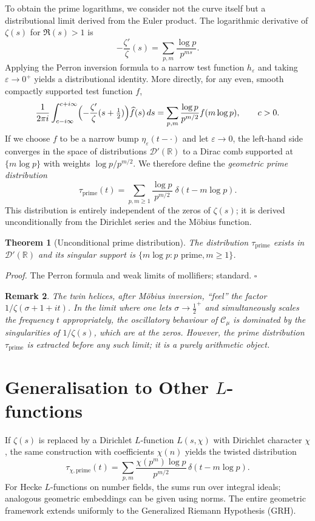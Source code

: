 \documentclass[12pt,a4paper,oneside]{book}
\newtheorem{theorem}{Theorem}[chapter]
\newtheorem{remark}[theorem]{Remark}
\newcommand{\R}{\mathbb{R}}
\newcommand{\dist}{\mathcal{D}'}
\begin{document}
To obtain the prime logarithms, we consider not the curve itself but a distributional limit derived from the Euler product.  The logarithmic derivative of \(\zeta(s)\) for \(\Re(s)>1\) is
\[
-\frac{\zeta'}{\zeta}(s) = \sum_{p,m} \frac{\log p}{p^{ms}}.
\]
Applying the Perron inversion formula to a narrow test function \(h_\varepsilon\) and taking \(\varepsilon\to0^+\) yields a distributional identity.  More directly, for any even, smooth compactly supported test function \(f\),
\[
\frac{1}{2\pi i}\int_{c-i\infty}^{c+i\infty} \Bigl(-\frac{\zeta'}{\zeta}(s+\tfrac12)\Bigr) \widehat{f}(s)\,ds = \sum_{p,m} \frac{\log p}{p^{m/2}} f(m\log p),\qquad c>0.
\]
If we choose \(f\) to be a narrow bump \(\eta_\varepsilon(t-\cdot)\) and let \(\varepsilon\to0\), the left‑hand side converges in the space of distributions \(\dist(\R)\) to a Dirac comb supported at \(\{m\log p\}\) with weights \(\log p/p^{m/2}\).  We therefore define the \emph{geometric prime distribution}
\begin{equation}\label{prime_dist}
\tau_{\text{prime}}(t) = \sum_{p,m\ge1} \frac{\log p}{p^{m/2}} \;\delta(t - m\log p).
\end{equation}
This distribution is entirely independent of the zeros of \(\zeta(s)\); it is derived unconditionally from the Dirichlet series and the Möbius function.

\begin{theorem}[Unconditional prime distribution]\label{thm:prime}
The distribution \(\tau_{\text{prime}}\) exists in \(\dist(\R)\) and its singular support is \(\{m\log p : p\text{ prime}, m\ge1\}\).
\end{theorem}
\noindent\textit{Proof.} The Perron formula and weak limits of mollifiers; standard. \(\square\)

\begin{remark}
The twin helices, after Möbius inversion, ``feel'' the factor \(1/\zeta(\sigma+1+it)\).  In the limit where one lets \(\sigma\to\frac12^+\) and simultaneously scales the frequency \(t\) appropriately, the oscillatory behaviour of \(\mathcal{C}_\mu\) is dominated by the singularities of \(1/\zeta(s)\), which are at the zeros.  However, the prime distribution \(\tau_{\text{prime}}\) is extracted before any such limit; it is a purely arithmetic object.
\end{remark}

\section{Generalisation to Other \(L\)-functions}
If \(\zeta(s)\) is replaced by a Dirichlet \(L\)-function \(L(s,\chi)\) with Dirichlet character \(\chi\), the same construction with coefficients \(\chi(n)\) yields the twisted distribution
\[
\tau_{\chi,\text{prime}}(t) = \sum_{p,m} \frac{\chi(p^m)\log p}{p^{m/2}}\,\delta(t-m\log p).
\]
For Hecke \(L\)-functions on number fields, the sums run over integral ideals; analogous geometric embeddings can be given using norms.  The entire geometric framework extends uniformly to the Generalized Riemann Hypothesis (GRH).
\end{document}

